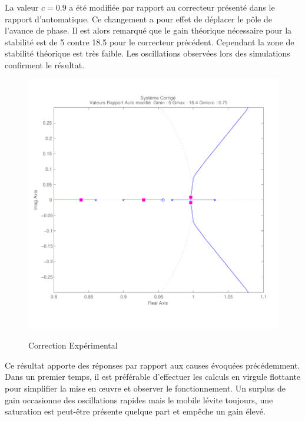 \documentclass[11pt, french]{article} %
\begin{document}
La valeur $c=0.9$ a été modifiée par rapport au correcteur présenté dans le rapport d'automatique. Ce changement a pour effet de déplacer le pôle de l'avance de phase. Il est alors remarqué que le gain théorique nécessaire pour la stabilité est de 5 contre 18.5 pour le correcteur précédent. Cependant la zone de stabilité théorique est très faible. Les oscillations observées lors des simulations confirment le résultat.

\begin{figure}[h!]
	\centering
	\includegraphics[width = 15cm,trim=0 1.4cm 0 0.7cm ,clip=true]
					{SolutionNumerique/SystemeCorrigeSolex.pdf}
	\label{CorrExpe}	
	\caption{Correction Expérimental}
\end{figure}

Ce résultat apporte des réponses par rapport aux causes évoquées précédemment. Dans un premier temps, il est préférable d'effectuer les calculs en virgule flottante pour simplifier la mise en œuvre et observer le fonctionnement. Un surplus de gain occasionne des oscillations rapides mais le mobile lévite toujours, une saturation est peut-être présente quelque part et empêche un gain élevé.
\end{document}

